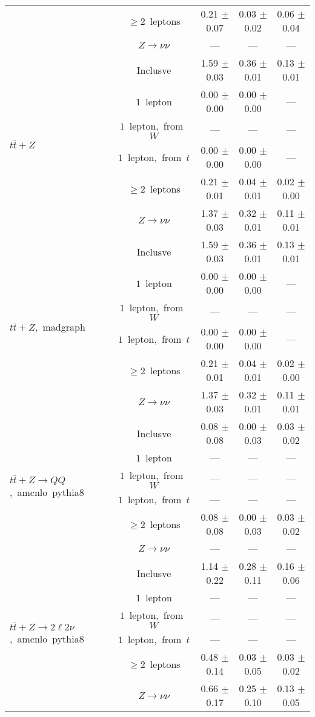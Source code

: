 \documentclass{article}
\begin{document}
\begin{longtable}{|l|c|c|c|c|}
 & $\ge2$~leptons  & 0.21 $\pm$ 0.07  & 0.03 $\pm$ 0.02  & 0.06 $\pm$ 0.04 \\* 
 & $Z\rightarrow\nu\nu$  & ---  & ---  & --- \\* 
\hline 
\multirow{6}{*}{$t\bar{t}+Z$} & Inclusve  & 1.59 $\pm$ 0.03  & 0.36 $\pm$ 0.01  & 0.13 $\pm$ 0.01 \\* 
 & $1$~lepton  & 0.00 $\pm$ 0.00  & 0.00 $\pm$ 0.00  & --- \\* 
 & $1$~lepton,~from~$W$  & ---  & ---  & --- \\* 
 & $1$~lepton,~from~$t$  & 0.00 $\pm$ 0.00  & 0.00 $\pm$ 0.00  & --- \\* 
 & $\ge2$~leptons  & 0.21 $\pm$ 0.01  & 0.04 $\pm$ 0.01  & 0.02 $\pm$ 0.00 \\* 
 & $Z\rightarrow\nu\nu$  & 1.37 $\pm$ 0.03  & 0.32 $\pm$ 0.01  & 0.11 $\pm$ 0.01 \\* 
\hline 
\multirow{6}{*}{$t\bar{t}+Z$,~madgraph} & Inclusve  & 1.59 $\pm$ 0.03  & 0.36 $\pm$ 0.01  & 0.13 $\pm$ 0.01 \\* 
 & $1$~lepton  & 0.00 $\pm$ 0.00  & 0.00 $\pm$ 0.00  & --- \\* 
 & $1$~lepton,~from~$W$  & ---  & ---  & --- \\* 
 & $1$~lepton,~from~$t$  & 0.00 $\pm$ 0.00  & 0.00 $\pm$ 0.00  & --- \\* 
 & $\ge2$~leptons  & 0.21 $\pm$ 0.01  & 0.04 $\pm$ 0.01  & 0.02 $\pm$ 0.00 \\* 
 & $Z\rightarrow\nu\nu$  & 1.37 $\pm$ 0.03  & 0.32 $\pm$ 0.01  & 0.11 $\pm$ 0.01 \\* 
\hline 
\multirow{6}{*}{$t\bar{t}+Z{\rightarrow}QQ$,~amcnlo~pythia8} & Inclusve  & 0.08 $\pm$ 0.08  & 0.00 $\pm$ 0.03  & 0.03 $\pm$ 0.02 \\* 
 & $1$~lepton  & ---  & ---  & --- \\* 
 & $1$~lepton,~from~$W$  & ---  & ---  & --- \\* 
 & $1$~lepton,~from~$t$  & ---  & ---  & --- \\* 
 & $\ge2$~leptons  & 0.08 $\pm$ 0.08  & 0.00 $\pm$ 0.03  & 0.03 $\pm$ 0.02 \\* 
 & $Z\rightarrow\nu\nu$  & ---  & ---  & --- \\* 
\hline 
\multirow{6}{*}{$t\bar{t}+Z{\rightarrow}2{\ell}2{\nu}$,~amcnlo~pythia8} & Inclusve  & 1.14 $\pm$ 0.22  & 0.28 $\pm$ 0.11  & 0.16 $\pm$ 0.06 \\* 
 & $1$~lepton  & ---  & ---  & --- \\* 
 & $1$~lepton,~from~$W$  & ---  & ---  & --- \\* 
 & $1$~lepton,~from~$t$  & ---  & ---  & --- \\* 
 & $\ge2$~leptons  & 0.48 $\pm$ 0.14  & 0.03 $\pm$ 0.05  & 0.03 $\pm$ 0.02 \\* 
 & $Z\rightarrow\nu\nu$  & 0.66 $\pm$ 0.17  & 0.25 $\pm$ 0.10  & 0.13 $\pm$ 0.05 \\* 
\hline 
\end{longtable} 
\end{document}
